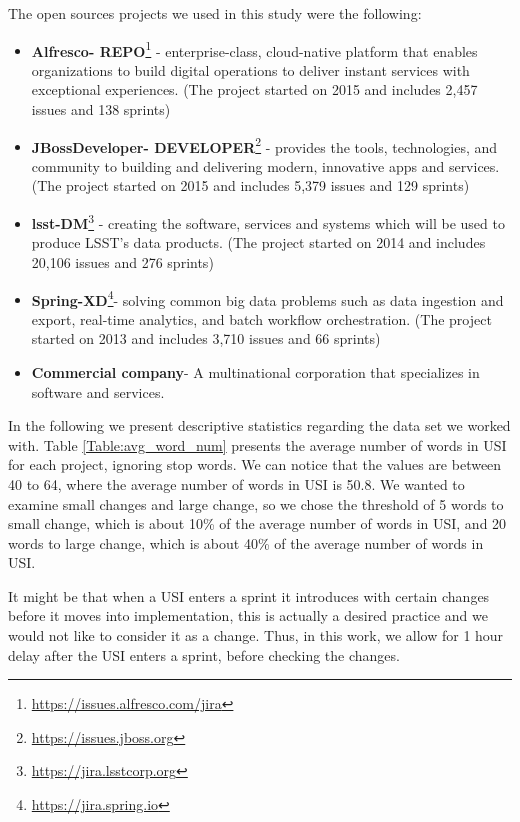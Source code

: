 The open sources projects we used in this study were the following:
\begin{itemize}
	\item \textbf{Alfresco- REPO}\footnote{\url{https://issues.alfresco.com/jira}} - enterprise-class, cloud-native platform that enables organizations to build digital operations to deliver instant services with exceptional experiences. 
	(The project started on 2015 and includes 2,457 issues and 138 sprints)
	\item \textbf{JBossDeveloper- DEVELOPER}\footnote{\url{https://issues.jboss.org}} - provides the tools, technologies, and community to building and delivering modern, innovative apps and services.
	(The project started on 2015 and includes 5,379 issues and 129 sprints)
	\item \textbf{lsst-DM}\footnote{\url{https://jira.lsstcorp.org}} - creating the software, services and systems which will be used to produce LSST's data products. %
	(The project started on 2014 and includes 20,106 issues and 276 sprints)
	\item \textbf{Spring-XD}\footnote{\url{https://jira.spring.io}}- solving common big data problems such as data ingestion and export, real-time analytics, and batch workflow orchestration. %
	(The project started on 2013 and includes 3,710 issues and 66 sprints)
	\item \textbf{Commercial company}- A multinational corporation that specializes in software and services.
\end{itemize}



In the following we present descriptive statistics regarding the data set we worked with. Table \ref{Table:avg_word_num} presents the average number of words in USI for each project, ignoring stop words. We can notice that the values are between 40 to 64, where the average number of words in USI is 50.8. We wanted to examine small changes and large change, so we chose the threshold of 5 words to small change, which is about 10\% of the average number of words in USI, and 20 words to large change, which is about 40\% of the average number of words in USI. 

It might be that when a USI enters a sprint it introduces with certain changes before it moves into implementation, this is actually a desired practice and we would not like to consider it as a change. Thus, in this work, we allow for 1 hour delay after the USI enters a sprint, before checking the changes.



